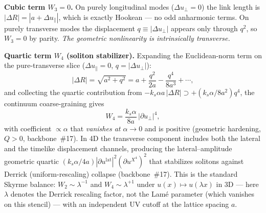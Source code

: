 \smallskip
\noindent\textbf{Cubic term $W_3 = 0$.}
On purely longitudinal modes ($\Delta u_\perp=0$) the link length is
$|\Delta R|=|a+\Delta u_\parallel|$, which is exactly Hookean --- no odd anharmonic terms.
On purely transverse modes the displacement $q\equiv|\Delta u_\perp|$ appears
only through $q^2$, so $W_3=0$ by parity.
\emph{The geometric nonlinearity is intrinsically transverse.}

\smallskip
\noindent\textbf{Quartic term $W_4$ (soliton stabilizer).}
Expanding the Euclidean-norm term on the pure-transverse slice
($\Delta u_\parallel=0$, $q=|\Delta u_\perp|$):
\begin{equation}
  |\Delta R| = \sqrt{a^2+q^2} = a + \frac{q^2}{2a} - \frac{q^4}{8a^3}+\cdots,
  \label{eq:link-length-expand}
\end{equation}
and collecting the quartic contribution from $-k_s\alpha a\,|\Delta R|\supset +(k_s\alpha/8a^2)q^4$,
the continuum coarse-graining gives
\begin{equation}
  \boxed{W_4 = \frac{k_s\alpha}{8a}\,\bigl|\partial u_\perp\bigr|^4,}
  \label{eq:W4}
\end{equation}
with coefficient $\propto\alpha$ that \emph{vanishes at $\alpha\to 0$} and is positive
(geometric hardening, $Q>0$, backbone~\#17).
In 4D the transverse component includes both the lateral and the timelike displacement
channels, producing the lateral--amplitude geometric quartic
$(k_s\alpha/4a)|\partial u^{\mathrm{lat}}|^2(\partial u^{X^4})^2$ that stabilizes solitons
against Derrick (uniform-rescaling) collapse (backbone~\#17).
This is the standard Skyrme balance: $W_2\sim\lambda^{-1}$ and $W_4\sim\lambda^{+1}$
under $u(x)\mapsto u(\lambda x)$ in 3D --- here $\lambda$ denotes the Derrick rescaling
factor, not the Lam\'e parameter (which vanishes on this stencil) --- with an
independent UV cutoff at the lattice spacing $a$.

